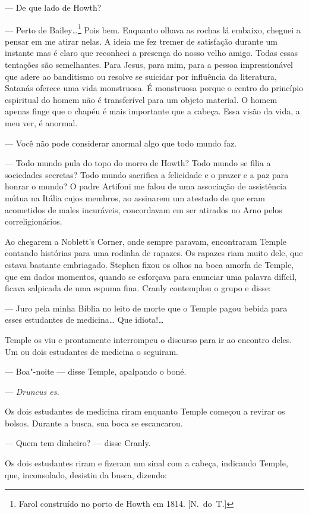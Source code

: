 --- De que lado de Howth?

--- Perto de Bailey\ldots{}\footnote{ Farol construído no porto de Howth
em 1814. [N.~do~T.]} Pois bem.  Enquanto olhava as rochas lá embaixo,
cheguei a pensar em me atirar nelas.  A ideia me fez tremer de
satisfação durante um instante mas é claro que reconheci a presença do
nosso velho amigo.  Todas essas tentações são semelhantes.  Para Jesus,
para mim, para a pessoa impressionável que adere ao banditismo ou
resolve se suicidar por influência da literatura, Satanás oferece uma
vida monstruosa.  É monstruosa porque o centro do princípio espiritual
do homem não é transferível para um objeto material.  O homem apenas
finge que o chapéu é mais importante que a cabeça.  Essa visão da vida,
a meu ver, é anormal.

--- Você não pode considerar anormal algo que todo mundo faz.

--- Todo mundo pula do topo do morro de Howth?  Todo mundo se
filia a sociedades secretas?  Todo mundo sacrifica a felicidade e o
prazer e a paz para honrar o mundo?  O padre Artifoni me falou de uma
associação de assistência mútua na Itália cujos membros, ao assinarem
um atestado de que eram acometidos de males incuráveis, concordavam em
ser atirados no Arno pelos correligionários.

Ao chegarem a Noblett’s Corner, onde sempre paravam, encontraram
Temple contando histórias para uma rodinha de rapazes.  Os rapazes riam
muito dele, que estava bastante embriagado.  Stephen fixou os olhos na
boca amorfa de Temple, que em dados momentos, quando se esforçava para
enunciar uma palavra difícil, ficava salpicada de uma espuma fina. 
Cranly contemplou o grupo e disse:

--- Juro pela minha Bíblia no leito de morte que o Temple pagou
bebida para esses estudantes de medicina\ldots{}  Que idiota!\ldots{}

Temple os viu e prontamente interrompeu o discurso para ir ao
encontro deles.  Um ou dois estudantes de medicina o seguiram.

--- Boa"-noite --- disse Temple, apalpando o boné.

--- \textit{Druncus es.}

Os dois estudantes de medicina riram enquanto Temple
começou a revirar os bolsos.  Durante a busca, sua boca se \mbox{escancarou}.

--- Quem tem dinheiro? --- disse Cranly.

Os dois estudantes riram e fizeram um sinal com a cabeça, indicando
Temple, que, inconsolado, desistiu da busca, dizendo:

